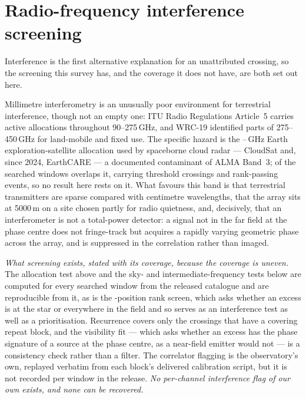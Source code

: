 \section{Radio-frequency interference screening}
\label{app:rfi}

Interference is the first alternative explanation for an unattributed
crossing, so the screening this survey has, and the coverage it does not
have, are both set out here.

Millimetre interferometry is an unusually poor environment for terrestrial
interference, though not an empty one: ITU Radio Regulations Article~5
carries active allocations throughout 90--275\,GHz, and WRC-19 identified
parts of 275--450\,GHz for land-mobile and fixed use. The specific hazard is
the \RadarLo--\RadarHi\,GHz Earth exploration-satellite allocation used by
spaceborne cloud radar --- CloudSat and, since 2024, EarthCARE --- a
documented contaminant of ALMA Band~3; \RadarNWin{} of the \RadarNTot{}
searched windows overlaps it, carrying \RadarNCross{} threshold crossings and
\RadarNStage{} rank-passing events, so no result here rests on it. What
favours this band is that terrestrial transmitters are sparse compared with
centimetre wavelengths, that the array sits at 5000\,m on a site chosen
partly for radio quietness, and, decisively, that an interferometer is not a
total-power detector: a signal not in the far field at the phase centre does
not fringe-track but acquires a rapidly varying geometric phase across the
array, and is suppressed in the correlation rather than imaged.

\emph{What screening exists, stated with its coverage, because the coverage
is uneven.} The allocation test above and the sky- and
intermediate-frequency tests below are computed for every searched window
from the released catalogue and are reproducible from it, as is the
\NCtrl-position rank screen, which asks whether an excess is at the star or
everywhere in the field and so serves as an interference test as well as a
prioritisation. Recurrence covers only the crossings that have a covering
repeat block, and the visibility fit --- which asks whether an excess has
the phase signature of a source at the phase centre, as a near-field emitter
would not --- is a consistency check rather than a filter. The correlator
flagging is the observatory's own, replayed verbatim from each block's
delivered calibration script, but it is not recorded per window in the
release. \emph{No per-channel interference flag of our own exists, and none
can be recovered.}


